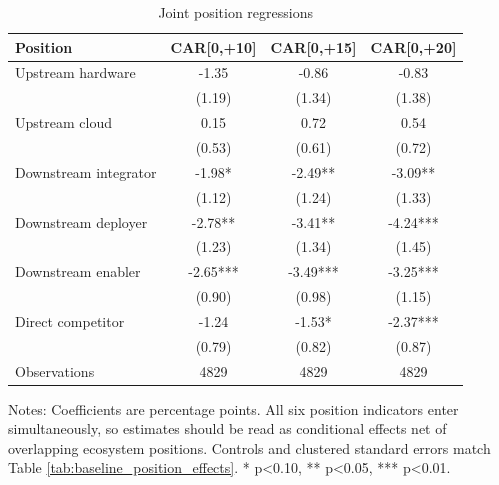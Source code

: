 \begin{table}[!htbp]
\centering
\small
\caption{Joint position regressions}
\label{tab:joint_position_effects}
\begin{tabular}{lccc}
\toprule
Position & CAR[0,+10] & CAR[0,+15] & CAR[0,+20]
\\
\midrule
Upstream hardware & -1.35 & -0.86 & -0.83
\\
 & (1.19) & (1.34) & (1.38)
\\
Upstream cloud & 0.15 & 0.72 & 0.54
\\
 & (0.53) & (0.61) & (0.72)
\\
Downstream integrator & -1.98* & -2.49** & -3.09**
\\
 & (1.12) & (1.24) & (1.33)
\\
Downstream deployer & -2.78** & -3.41** & -4.24***
\\
 & (1.23) & (1.34) & (1.45)
\\
Downstream enabler & -2.65*** & -3.49*** & -3.25***
\\
 & (0.90) & (0.98) & (1.15)
\\
Direct competitor & -1.24 & -1.53* & -2.37***
\\
 & (0.79) & (0.82) & (0.87)
\\
\midrule
Observations & 4829 & 4829 & 4829
\\
\bottomrule
\end{tabular}
\begin{minipage}{0.94\linewidth}\vspace{0.4em}\footnotesize Notes: Coefficients are percentage points. All six position indicators enter simultaneously, so estimates should be read as conditional effects net of overlapping ecosystem positions. Controls and clustered standard errors match Table \ref{tab:baseline_position_effects}. * p<0.10, ** p<0.05, *** p<0.01.\end{minipage}
\end{table}

